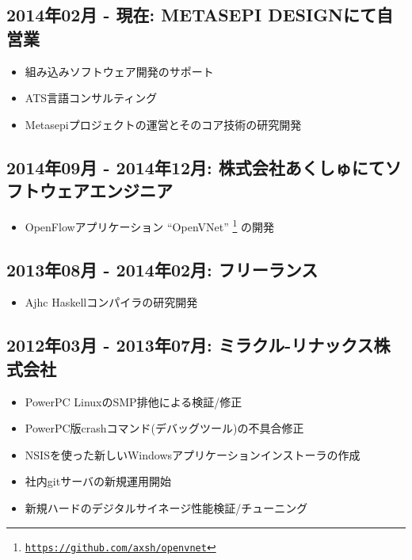 \documentclass[letterpaper]{article}
\begin{document}
\subsection*{2014年02月 - 現在: METASEPI DESIGNにて自営業}

\begin{itemize}
  \item 組み込みソフトウェア開発のサポート
  \item ATS言語コンサルティング
  \item Metasepiプロジェクトの運営とそのコア技術の研究開発
\end{itemize}

\subsection*{2014年09月 - 2014年12月: 株式会社あくしゅにてソフトウェアエンジニア}

\begin{itemize}
  \item OpenFlowアプリケーション ``OpenVNet'' \footnote{\href{https://github.com/axsh/openvnet}{\tt https://github.com/axsh/openvnet}} の開発
\end{itemize}

\subsection*{2013年08月 - 2014年02月: フリーランス}

\begin{itemize}
  \item Ajhc Haskellコンパイラの研究開発
\end{itemize}

\subsection*{2012年03月 - 2013年07月: ミラクル-リナックス株式会社}

\begin{itemize}
  \item PowerPC LinuxのSMP排他による検証/修正
  \item PowerPC版crashコマンド(デバッグツール)の不具合修正
  \item NSISを使った新しいWindowsアプリケーションインストーラの作成
  \item 社内gitサーバの新規運用開始
  \item 新規ハードのデジタルサイネージ性能検証/チューニング
\end{itemize}
\end{document}
